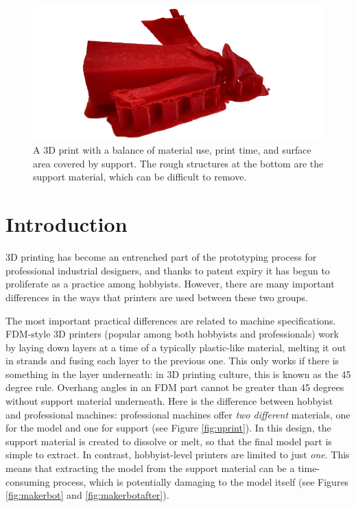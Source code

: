 \documentclass{sigchi}
\begin{document}
\begin{figure}
\centering
\includegraphics[width=7in]{images/printed.jpg}
\caption{A 3D print with a balance of material use, print time, and surface area covered by support.  The rough structures at the bottom are the support material, which can be difficult to remove.}
\label{fig:printed}
\end{figure}

\section{Introduction}
3D printing has become an entrenched part of the prototyping process for professional industrial designers, and thanks to patent expiry it has begun to proliferate as a practice among hobbyists.  However, there are many important differences in the ways that printers are used between these two groups.

The most important practical differences are related to machine specifications.  FDM-style 3D printers (popular among both hobbyists and professionals) work by laying down layers at a time of a typically plastic-like material, melting it out in strands and fusing each layer to the previous one.  This only works if there is something in the layer underneath: in 3D printing culture, this is known as the 45 degree rule.  Overhang angles in an FDM part cannot be greater than 45 degrees without support material underneath.  Here is the difference between hobbyist and professional machines: professional machines offer \emph{two different} materials, one for the model and one for support (see Figure \ref{fig:uprint}).  In this design, the support material is created to dissolve or melt, so that the final model part is simple to extract.  In contrast, hobbyist-level printers are limited to just \emph{one}.  This means that extracting the model from the support material can be a time-consuming process, which is potentially damaging to the model itself (see Figures \ref{fig:makerbot} and \ref{fig:makerbotafter}).
\end{document}
